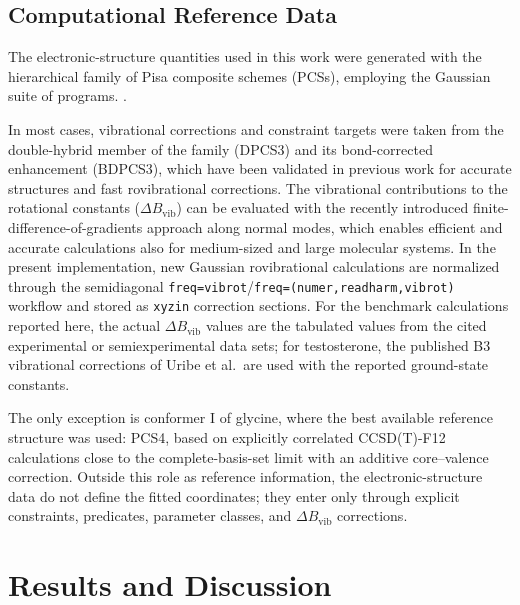 \documentclass[aip,jcp,reprint,longbibliography,floatfix]{revtex4-2}
\begin{document}
\subsection{Computational Reference Data}

The electronic-structure quantities used in this work were generated with the
hierarchical family of Pisa composite schemes (PCSs),\cite{pcs1234_2024,Lazzari2025LCB25} employing the Gaussian suite of programs.
\cite{g16}.

In most cases, vibrational corrections and constraint targets were taken from the
double-hybrid member of the family (DPCS3) and its bond-corrected enhancement (BDPCS3),
which have been validated in previous work for accurate structures and fast rovibrational corrections.\cite{wires_2025,Mendolicchio2025FastDvib,acr_2026}
The vibrational contributions to the rotational constants
($\Delta B_\mathrm{vib}$) can be evaluated with the recently introduced
finite-difference-of-gradients approach along normal modes, which enables
efficient and accurate calculations also for medium-sized and large molecular
systems.\cite{Mendolicchio2025FastDvib} In the present implementation,
new Gaussian rovibrational calculations are normalized through the
semidiagonal \texttt{freq=vibrot}/\texttt{freq=(numer,readharm,vibrot)}
workflow and stored as \texttt{xyzin} correction sections. For the benchmark
calculations reported here, the actual $\Delta B_\mathrm{vib}$ values are the
tabulated values from the cited experimental or semiexperimental data sets;
for testosterone, the published B3 vibrational corrections of
Uribe et al.\ are used with the reported ground-state constants.

The only exception is conformer I of glycine, where the best available reference structure was used: PCS4, based on explicitly correlated CCSD(T)-F12 calculations close to the complete-basis-set limit with an additive core--valence correction. Outside this role as reference information, the electronic-structure
data do not define the fitted coordinates; they enter only through explicit
constraints, predicates, parameter classes, and $\Delta B_\mathrm{vib}$
corrections.


\section{Results and Discussion}
\end{document}
